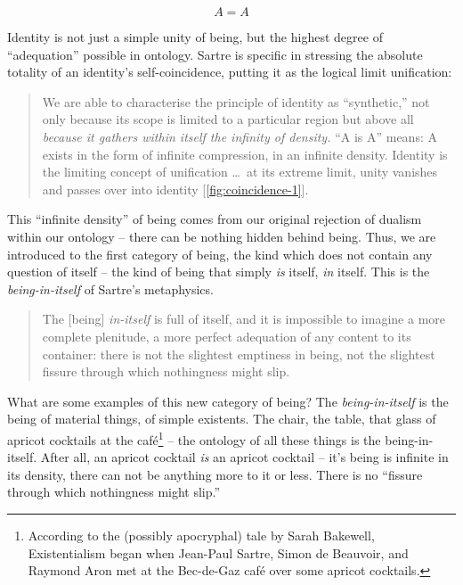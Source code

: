 \begin{equation}
    A = A
\end{equation}

\noindent
Identity is not just a simple unity of being, but the highest degree of \enquote{adequation} possible in ontology. Sartre is specific in stressing the absolute totality of an identity's self-coincidence, putting it as the logical limit unification:



\blockcquote[123]{Sartre}{%
    We are able to characterise the principle of identity as \enquote{synthetic,} not only because its scope is limited to a particular region but above all \emph{because it gathers within itself the infinity of density.} \enquote{A is A} means: A exists in the form of infinite compression, in an infinite density. Identity is the limiting concept of unification \ldots\ at its extreme limit, unity vanishes and passes over into identity [\autoref{fig:coincidence-1}].
}

\noindent
This \enquote{infinite density} of being comes from our original rejection of dualism within our ontology -- there can be nothing hidden behind being.  Thus, we are introduced to the first category of being, the kind which does not contain any question of itself -- the kind of being that simply \emph{is} itself, \emph{in} itself. This is the \emph{being-in-itself} of Sartre's metaphysics. 

\blockcquote[123]{Sartre}{%
    The [being] \emph{in-itself} is full of itself, and it is impossible to imagine a more complete plenitude, a more perfect adequation of any content to its container: there is not the slightest emptiness in being, not the slightest fissure through which nothingness might slip.
}


\noindent
What are some examples of this new category of being? The \emph{being-in-itself} is the being of material things, of simple existents. The chair, the table, that glass of apricot cocktails at the café\footnote{According to the (possibly apocryphal) tale by Sarah Bakewell, Existentialism began when Jean-Paul Sartre, Simon de Beauvoir, and Raymond Aron met at the Bec-de-Gaz café over some apricot cocktails.} -- the ontology of all these things is the being-in-itself. After all, an apricot cocktail \emph{is} an apricot cocktail -- it's being is infinite in its density, there can not be anything more to it or less. There is no \enquote{fissure through which nothingness might slip.}

